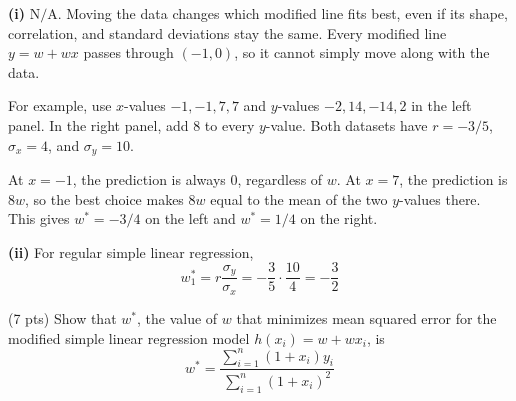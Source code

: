 \documentclass[11pt,twoside]{article}
\begin{document}
\begin{prob}[(16 pts)]
\begin{subprob}
\begin{solution}
\textbf{(i)} $\boxed{\text{N/A}}$. Moving the data changes which modified line fits best, even if its shape, correlation, and standard deviations stay the same. Every modified line $y=w+wx$ passes through $(-1,0)$, so it cannot simply move along with the data.

For example, use $x$-values $-1,-1,7,7$ and $y$-values $-2,14,-14,2$ in the left panel. In the right panel, add $8$ to every $y$-value. Both datasets have $r=-3/5$, $\sigma_x=4$, and $\sigma_y=10$.
\begin{center}
\end{center}
At $x=-1$, the prediction is always $0$, regardless of $w$. At $x=7$, the prediction is $8w$, so the best choice makes $8w$ equal to the mean of the two $y$-values there. This gives $w^*=-3/4$ on the left and $w^*=1/4$ on the right.

\textbf{(ii)} For regular simple linear regression,
\[
w_1^*=r\frac{\sigma_y}{\sigma_x}
=-\frac35\cdot\frac{10}{4}=\boxed{-\frac32}
\]
\end{solution}
\end{subprob}
\endgroup

\newpage
\begin{subprob}(7 pts) Show that $w^*$, the value of $w$ that minimizes mean squared error for the modified simple linear regression model $h(x_i)=w+wx_i$, is
$$
w^*=\frac{\displaystyle\sum_{i=1}^n(1+x_i)y_i}{\displaystyle\sum_{i=1}^n(1+x_i)^2}
$$



\end{subprob}
\end{prob}
\end{document}
